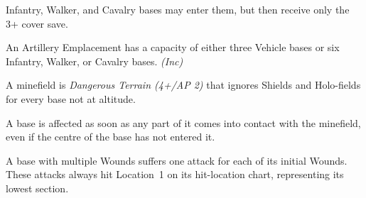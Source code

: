 \begin{description}
    Infantry, Walker, and Cavalry bases may enter them, but then receive only the 3+ cover save.

    An Artillery Emplacement has a capacity of either three Vehicle bases or six Infantry, Walker, or Cavalry bases. \textit{(Inc)}

    \item[Minefields:] A minefield is \textit{Dangerous Terrain (4+/AP 2)} that ignores Shields and Holo-fields for every base not at altitude.

    A base is affected as soon as any part of it comes into contact with the minefield, even if the centre of the base has not entered it.

    A base with multiple Wounds suffers one attack for each of its initial Wounds. These attacks always hit Location~1 on its hit-location chart, representing its lowest section.
\end{description}

